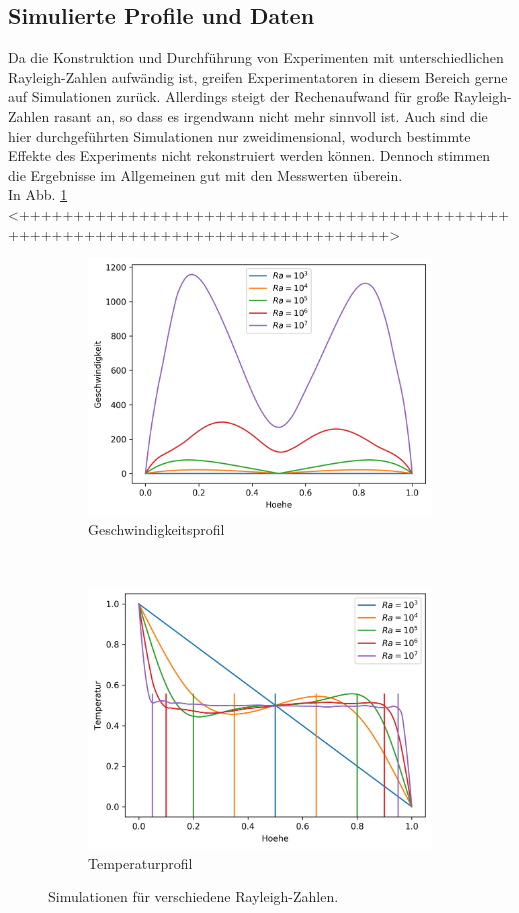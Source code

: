 \documentclass[12pt,a4paper,titlepage,headinclude]{scrartcl}
\numberwithin{equation}{subsection}
\begin{document}
\subsection{Simulierte Profile und Daten}
Da die Konstruktion und Durchführung von Experimenten mit unterschiedlichen Rayleigh-Zahlen aufwändig ist, greifen Experimentatoren in diesem Bereich gerne auf Simulationen zurück.
Allerdings steigt der Rechenaufwand für große Rayleigh-Zahlen rasant an, so dass es irgendwann nicht mehr sinnvoll ist.
Auch sind die hier durchgeführten Simulationen nur zweidimensional, wodurch bestimmte Effekte des Experiments nicht rekonstruiert werden können.
Dennoch stimmen die Ergebnisse im Allgemeinen gut mit den Messwerten überein.\\

In Abb. \ref{fig:v_num} <++++++++++++++++++++++++++++++++++++++++++++++++++++++++++++++++++++++++++++++++>
\begin{figure}[!ht]
	\centering
    \begin{subfigure}[t]{0.49\textwidth}
        \centering
	\includegraphics[width=0.9\linewidth]{V}
        \caption{Geschwindigkeitsprofil}
	\label{fig:v_num}
    \end{subfigure}%
    ~ 
    \begin{subfigure}[t]{0.49\textwidth}
        \centering
	\includegraphics[width=0.9\linewidth]{T}
        \caption{Temperaturprofil}
	\label{fig:t_num}
    \end{subfigure}
    \caption{Simulationen für verschiedene Rayleigh-Zahlen.}
\end{figure}
\end{document}
